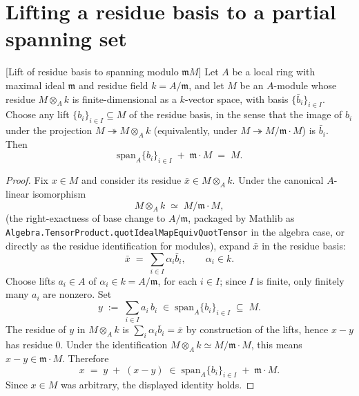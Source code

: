 \section{Lifting a residue basis to a partial spanning set}

\begin{lemma}
  \label{lem:lift-residue-basis-to-spanning}
  [Lift of residue basis to spanning modulo \(\mathfrak{m} M\)]
  Let \(A\) be a local ring with maximal ideal \(\mathfrak{m}\)
  and residue field \(k = A/\mathfrak{m}\), and let \(M\) be an
  \(A\)-module whose residue \(M \otimes_A k\) is finite-dimensional
  as a \(k\)-vector space, with basis
  \(\{\bar b_i\}_{i \in I}\). Choose any lift
  \(\{b_i\}_{i \in I} \subseteq M\) of the residue basis, in the
  sense that the image of \(b_i\) under the projection
  \(M \twoheadrightarrow M \otimes_A k\) (equivalently, under
  \(M \twoheadrightarrow M / \mathfrak{m} \cdot M\)) is \(\bar b_i\).
  Then
  \[
    \mathrm{span}_A \{b_i\}_{i \in I} \;+\; \mathfrak{m} \cdot M
    \;=\; M.
  \]
\end{lemma}

\begin{proof}
  Fix \(x \in M\) and consider its residue
  \(\bar x \in M \otimes_A k\). Under the canonical
  \(A\)-linear isomorphism
  \[
    M \otimes_A k \;\simeq\; M / \mathfrak{m} \cdot M,
  \]
  (the right-exactness of base change to \(A/\mathfrak{m}\), packaged
  by Mathlib as
  \texttt{Algebra.TensorProduct.quotIdealMapEquivQuotTensor} in the
  algebra case, or directly as the residue identification for
  modules), expand \(\bar x\) in the residue basis:
  \[
    \bar x \;=\; \sum_{i \in I} \alpha_i \bar b_i, \qquad \alpha_i \in k.
  \]
  Choose lifts \(a_i \in A\) of \(\alpha_i \in k = A/\mathfrak{m}\),
  for each \(i \in I\); since \(I\) is finite, only finitely many
  \(a_i\) are nonzero. Set
  \[
    y \;:=\; \sum_{i \in I} a_i \, b_i \;\in\; \mathrm{span}_A
      \{b_i\}_{i \in I} \;\subseteq\; M.
  \]
  The residue of \(y\) in \(M \otimes_A k\) is
  \(\sum_i \alpha_i \bar b_i = \bar x\) by construction of the
  lifts, hence \(x - y\) has residue \(0\). Under the identification
  \(M \otimes_A k \simeq M / \mathfrak{m} \cdot M\), this means
  \(x - y \in \mathfrak{m} \cdot M\). Therefore
  \[
    x \;=\; y \;+\; (x - y) \;\in\; \mathrm{span}_A \{b_i\}_{i \in I}
      \;+\; \mathfrak{m} \cdot M.
  \]
  Since \(x \in M\) was arbitrary, the displayed identity holds.
\end{proof}

